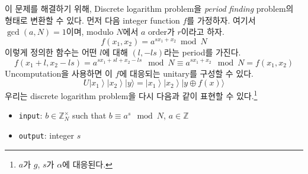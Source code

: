 이 문제를 해결하기 위해, Discrete logarithm problem을 \textit{period finding} problem의 형태로 변환할 수 있다.
먼저 다음 integer function $f$를 가정하자. 여기서 $\gcd(a, N) = 1$이며, modulo $N$에서 $a$ order가 $r$이라고 하자. 
\begin{equation*}
  f\left(x_1, x_2\right)=a^{s x_1+x_2} \bmod N
\end{equation*}
이렇게 정의한 함수는 어떤 $l$에 대해 $(l, -ls)$라는 period를 가진다.
\begin{equation*}
  f(x_1+l, x_2-ls)=a^{sx_1 + sl + x_2 - ls} \mod N \equiv a^{sx_1 + x_2} \mod N = f(x_1, x_2)
\end{equation*}
Uncomputation을 사용하면 이 $f$에 대응되는 unitary를 구성할 수 있다.
\begin{equation*}
  U\left|x_1\right\rangle\left|x_2\right\rangle|y\rangle=\left|x_1\right\rangle\left|x_2\right\rangle|y \oplus f(x)\rangle
  \end{equation*}
우리는 discrete logarithm problem을 다시 다음과 같이 표현할 수 있다.\footnote{$a$가 $g$, $s$가 $\alpha$에 대응된다.}
\begin{itemize}
  \item \texttt{input}: $b \in \mathbb Z_N^\times$ such that $b \equiv a^s \mod N$, $a \in \mathbb Z$
  \item \texttt{output}: integer $s$
\end{itemize}

